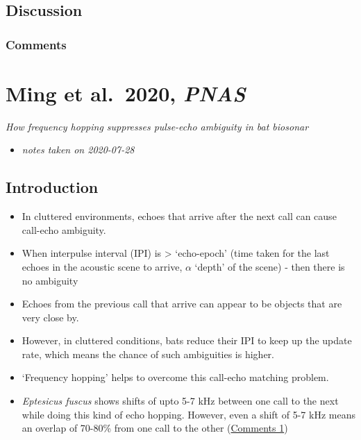 \documentclass[
]{book}
\providecommand{\tightlist}{%
  \setlength{\itemsep}{0pt}\setlength{\parskip}{0pt}}
\begin{document}
\hypertarget{discussion-3}{%
\section{Discussion}\label{discussion-3}}

\hypertarget{com_libehav}{%
\subsection{Comments}\label{com_libehav}}

\hypertarget{ming-et-al.-2020-pnas}{%
\chapter{\texorpdfstring{Ming et al.~2020, \emph{PNAS}}{Ming et al.~2020, PNAS}}\label{ming-et-al.-2020-pnas}}


\emph{How frequency hopping suppresses pulse-echo ambiguity in bat biosonar} \citep{Ming17288}

\begin{itemize}
\tightlist
\item
  \emph{notes taken on 2020-07-28}
\end{itemize}

\hypertarget{introduction-8}{%
\section{Introduction}\label{introduction-8}}

\begin{itemize}
\tightlist
\item
  In cluttered environments, echoes that arrive after the next call can cause call-echo ambiguity.
\item
  When interpulse interval (IPI) is \textgreater{} `echo-epoch' (time taken for the last echoes in the acoustic scene to arrive, \(\alpha\) `depth' of the scene) - then there is no ambiguity
\item
  Echoes from the previous call that arrive can appear to be objects that are very close by.
\item
  However, in cluttered conditions, bats reduce their IPI to keep up the update rate, which means the chance of such ambiguities is higher.
\item
  `Frequency hopping' helps to overcome this call-echo matching problem.
\item
  \emph{Eptesicus fuscus} shows shifts of upto 5-7 kHz between one call to the next while doing this kind of echo hopping. However, even a shift of 5-7 kHz means an overlap of 70-80\% from one call to the other (\protect\hyperlink{com_ming}{Comments 1})
\end{itemize}
\end{document}
